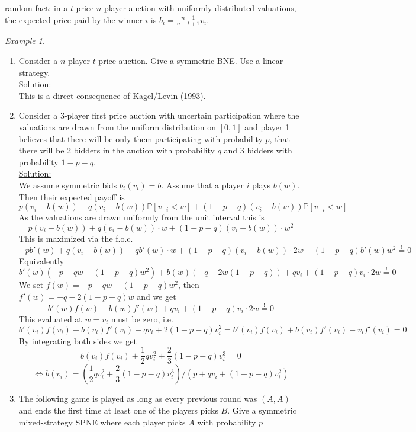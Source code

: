 \documentclass[a4paper, 12pt]{article}
\theoremstyle{plain}
\theoremstyle{definition}
\theoremstyle{lemma}
\theoremstyle{remark}
\theoremstyle{corollary}
\theoremstyle{example}
\newtheorem{example}[theorem]{Example}
\begin{document}
	random fact: in a $t$-price $n$-player auction with uniformly distributed valuations, the expected price paid by the winner $i$ is $b_i = \frac{n-1}{n-t+1}v_i$.
	\begin{example}
		\begin{enumerate}
			\item Consider a $n$-player $t$-price auction. Give a symmetric BNE. Use a linear strategy.\\
			\underline{Solution:}\\
			This is a direct consequence of Kagel/Levin (1993).
			\item Consider a $3$-player first price auction with uncertain participation where the valuations are drawn from the uniform distribution on $[0,1]$ and player 1 believes that there will be only them participating with probability $p$, that there will be 2 bidders in the auction with probability $q$ and 3 bidders with probability $1-p-q$.\\
			\underline{Solution:}\\
			We assume symmetric bids $b_i(v_i) = b$. Assume that a player $i$ plays $b(w)$. Then their expected payoff is \[p(v_i-b(w)) + q(v_i-b(w))\mathbb{P}[v_{-i}<w] + (1-p-q)(v_i-b(w))\mathbb{P}[v_{-i}<w]\] As the valuations are drawn uniformly from the unit interval this is \[p(v_i-b(w)) + q(v_i-b(w))\cdot w + (1-p-q)(v_i-b(w))\cdot w^2\]
			This is maximized via the f.o.c. \[-pb'(w) + q(v_i-b(w)) - qb'(w)\cdot w + (1-p-q)(v_i-b(w))\cdot 2w - (1-p-q)b'(w)w^2 \overset{!}{=} 0\]
			Equivalently \[b'(w)(-p-qw-(1-p-q)w^2) + b(w)(-q-2w(1-p-q)) +qv_i+(1-p-q)v_i\cdot 2w \overset{!}{=} 0\]
			We set $f(w) = -p-qw-(1-p-q)w^2$, then $f'(w) = -q-2(1-p-q)w$ and we get \[b'(w)f(w) + b(w)f'(w) +qv_i+(1-p-q)v_i\cdot 2w \overset{!}{=} 0\]
			This evaluated at $w=v_i$ must be zero, i.e. \[b'(v_i)f(v_i) + b(v_i)f'(v_i) + qv_i + 2(1-p-q)v_i^2 = b'(v_i)f(v_i) + b(v_i)f'(v_i) - v_if'(v_i) = 0\]
			By integrating both sides we get \[b(v_i)f(v_i) + \frac{1}{2}qv_i^2 + \frac{2}{3}(1-p-q)v_i^3 = 0\]
			\[\Leftrightarrow b(v_i) = (\frac{1}{2}qv_i^2 + \frac{2}{3}(1-p-q)v_i^3)/(p+qv_i+(1-p-q)v_i^2)\]
			\item The following game is played as long as every previous round was $(A,A)$ and ends the first time at least one of the players picks $B$. Give a symmetric mixed-strategy SPNE where each player picks $A$ with probability $p$
			\begin{center}
				\begin{table}[h]
					\centering
					\begin{tabular}{|c|c|}

\end{tabular}
\end{table}
\end{center}
\end{enumerate}
\end{example}
\end{document}
